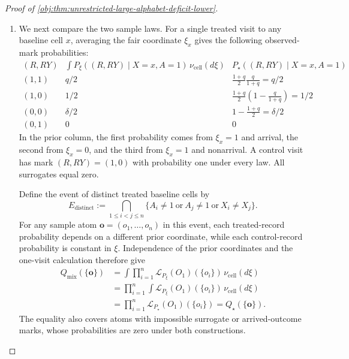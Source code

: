\documentclass[11pt]{article}
\begin{document}
\begin{proof}[Proof of \cref{obj:thm:unrestricted-large-alphabet-deficit-lower}]
\begin{enumerate}
Under \(P_\star\), an action in \(E_{\mathrm{test}}^c\) satisfies
\[
w-\tau(P_\star)
>
\left(\frac12-\frac{h_{\mathrm{sep}}}{2}\right)
-\left(\frac12-h_{\mathrm{sep}}\right)
=\frac{h_{\mathrm{sep}}}{2}.
\]
In particular, its squared loss is at least \(h_{\mathrm{sep}}^2/16\), so
\[
\frac{h_{\mathrm{sep}}^2}{16}
(Q_\star\ltimes\mathsf T)(E_{\mathrm{test}}^c)
\le\mathcal R_\star(\mathsf T).
\]

\item We next compare the two sample laws. For a single treated visit to any baseline cell \(x\), averaging the fair coordinate \(\xi_x\) gives the following observed-mark probabilities:
\[
\begin{array}{c|c|c}
(R,RY)
&
\displaystyle\int P_\xi((R,RY)\mid X=x,A=1)\,
\nu_{\mathrm{cell}}(d\xi)
&
P_\star((R,RY)\mid X=x,A=1)
\\ \hline
(1,1)&q/2&
\displaystyle\frac{1+q}{2}\frac q{1+q}=q/2
\\
(1,0)&1/2&
\displaystyle\frac{1+q}{2}\left(1-\frac q{1+q}\right)=1/2
\\
(0,0)&\delta/2&
\displaystyle1-\frac{1+q}{2}=\delta/2
\\
(0,1)&0&0
\end{array}
\]
In the prior column, the first probability comes from \(\xi_x=1\) and arrival, the second from \(\xi_x=0\), and the third from \(\xi_x=1\) and nonarrival. A control visit has mark \((R,RY)=(1,0)\) with probability one under every law. All surrogates equal zero.

Define the event of distinct treated baseline cells by
\[
E_{\mathrm{distinct}}
:=
\bigcap_{1\le i<j\le n}
\{A_i\ne1\ \text{or}\ A_j\ne1\ \text{or}\ X_i\ne X_j\}.
\]
For any sample atom \(\mathbf o=(o_1,\ldots,o_n)\) in this event, each treated-record probability depends on a different prior coordinate, while each control-record probability is constant in \(\xi\). Independence of the prior coordinates and the one-visit calculation therefore give
\[
\begin{aligned}
Q_{\mathrm{mix}}(\{\mathbf o\})
&=
\int
\prod_{i=1}^n
\mathcal L_{P_\xi}(O_1)(\{o_i\})\,
\nu_{\mathrm{cell}}(d\xi)
\\
&=
\prod_{i=1}^n
\int
\mathcal L_{P_\xi}(O_1)(\{o_i\})\,
\nu_{\mathrm{cell}}(d\xi)
\\
&=
\prod_{i=1}^n
\mathcal L_{P_\star}(O_1)(\{o_i\})
=
Q_\star(\{\mathbf o\}).
\end{aligned}
\]
The equality also covers atoms with impossible surrogate or arrived-outcome marks, whose probabilities are zero under both constructions. %


\end{enumerate}
\end{proof}
\end{document}
